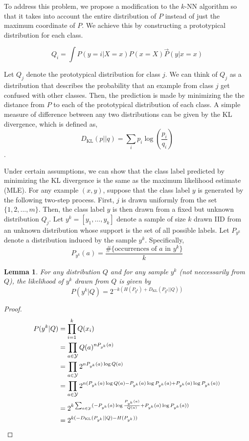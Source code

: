 \documentclass{article}
\newtheorem{lemma}[theorem]{Lemma}
\begin{document}
\newcommand{\dkl}{D_{\mathrm{KL}}}

To address this problem, we propose a modification to the $k$-NN
algorithm so that it takes into account the entire distribution of $P$
instead of just the maximum coordinate of $P$. We achieve this by
constructing a prototypical distribution for each class. 

\[
Q_i = \int P(y=i|X=x)P(x=X) \vec{P}(y|x=x)
\]

Let $Q_j$
denote the prototypical distribution for class $j$. We can think of
$Q_j$ as a distribution that describes the probability that an example
from class $j$ get confused with other classes. Then, the prediction
is made by minimizing the the distance from $P$ to each of the
prototypical distribution of each class. A simple measure of
difference between any two distributions can be given by the KL
divergence, which is defined as,
\[
\dkl(p || q) = \sum_i p_i \log(\frac{p_i}{q_i})
\]. 

Under certain assumptions, we can show that the class label predicted
by minimizing the KL divergence is the same as the maximum likelihood
estimate (MLE). For any example $(x,y)$, suppose that the class label $y$ is
generated by the following two-step process. First, $j$ is drawn
uniformly from the set $\{1,2,...,m\}$. Then, the class label $y$ is
then drawn from a fixed but unknown distribution $Q_j$. Let $y^k =
[y_1, \ldots, y_k]$ denote a sample of size $k$ drawn IID from an
unknown distribution whose support is the set of all possible
labels. Let $P_{y^k}$ denote a distribution 
induced by the sample $y^k$. Specifically,
\[
P_{y^k}(a) = \frac{\#\{ \mbox{occurrences of } a \mbox{ in } y^k\}}{k}
\]

\begin{lemma}
\label{lemma:1}
For any distribution $Q$ and for any sample $y^k$ (not neccessarily
from $Q$), the likelihood of $y^k$ drawn from $Q$ is given by
\[
P(y^k|Q) = 2^{-k(H(P_{y^k}) + \dkl(P_{y^k} || Q))}
\]
\end{lemma}
\begin{proof}
  \begin{align*}
    P(y^k|Q) 
&= \prod_{i=1}^k Q(x_i)\\ 
&= \prod_{a \in \Y} Q(a)^{nP_{y^k}(a)}\\ 
&= \prod_{a \in \Y} 2^{nP_{y^k}(a) \log Q(a)}\\ 
&= \prod_{a \in \Y} 2^{n(P_{y^k}(a) \log Q(a) - P_{y^k}(a) \log P_{y^k}(a) + P_{y^k}(a) \log P_{y^k}(a))}\\ 
&= 2^{k \sum_{a \in \Y} (-P_{y^k}(a) \log \frac{P_{y^k}(a)}{Q(a)} + P_{y^k}(a) \log P_{y^k}(a) )}\\ 
&= 2^{k(-\dkl(P_{y^k}||Q) - H(P_{y^k}))}\\
  \end{align*}
\end{proof}
\end{document}
